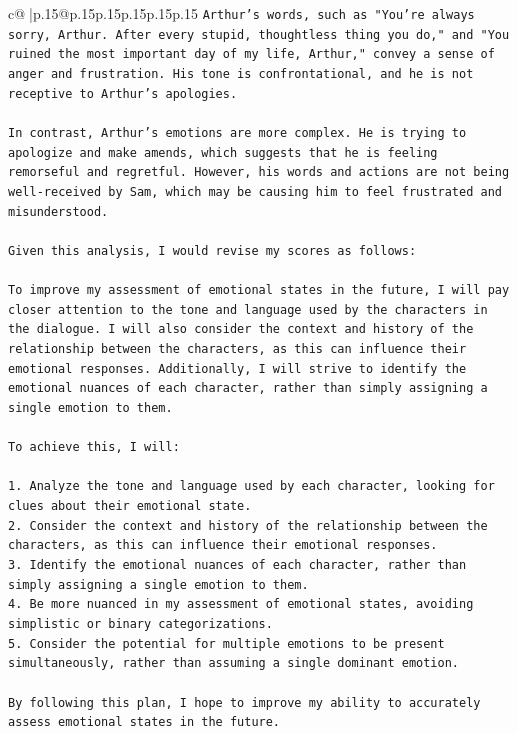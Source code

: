 \documentclass{article}
\begin{document}
{\begin{supertabular}{c@{$\;$}|p{.15\linewidth}@{}p{.15\linewidth}p{.15\linewidth}p{.15\linewidth}p{.15\linewidth}p{.15\linewidth}}
{{{\texttt{Arthur's words, such as "You're always sorry, Arthur. After every stupid, thoughtless thing you do," and "You ruined the most important day of my life, Arthur," convey a sense of anger and frustration. His tone is confrontational, and he is not receptive to Arthur's apologies.} \\
\\ 
\texttt{In contrast, Arthur's emotions are more complex. He is trying to apologize and make amends, which suggests that he is feeling remorseful and regretful. However, his words and actions are not being well{-}received by Sam, which may be causing him to feel frustrated and misunderstood.} \\
\\ 
\texttt{Given this analysis, I would revise my scores as follows:} \\
\\ 
\texttt{To improve my assessment of emotional states in the future, I will pay closer attention to the tone and language used by the characters in the dialogue. I will also consider the context and history of the relationship between the characters, as this can influence their emotional responses. Additionally, I will strive to identify the emotional nuances of each character, rather than simply assigning a single emotion to them.} \\
\\ 
\texttt{To achieve this, I will:} \\
\\ 
\texttt{1. Analyze the tone and language used by each character, looking for clues about their emotional state.} \\
\texttt{2. Consider the context and history of the relationship between the characters, as this can influence their emotional responses.} \\
\texttt{3. Identify the emotional nuances of each character, rather than simply assigning a single emotion to them.} \\
\texttt{4. Be more nuanced in my assessment of emotional states, avoiding simplistic or binary categorizations.} \\
\texttt{5. Consider the potential for multiple emotions to be present simultaneously, rather than assuming a single dominant emotion.} \\
\\ 
\texttt{By following this plan, I hope to improve my ability to accurately assess emotional states in the future.} \\
\\ 
}}}
\end{supertabular}}
\end{document}

